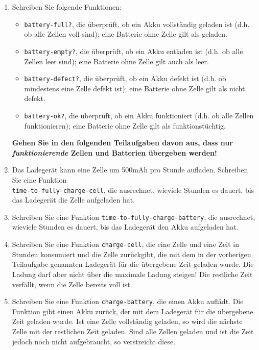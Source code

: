\begin{aufgabe}
\begin{enumerate}
  \item Schreiben Sie folgende Funktionen:

    \begin{itemize}
    \item \texttt{battery-full?}, die überprüft, ob ein Akku
      vollständig geladen ist (d.h. ob alle Zellen voll sind); eine
      Batterie ohne Zelle gilt als geladen.

    \item \texttt{battery-empty?}, die überprüft, ob ein Akku entladen
      ist (d.h. ob alle Zellen leer sind); eine Batterie ohne Zelle
      gilt auch als leer.

    \item \texttt{battery-defect?}, die überprüft, ob ein Akku defekt
      ist (d.h. ob mindestens eine Zelle defekt ist); eine Batterie
      ohne Zelle gilt als nicht defekt.

    \item \texttt{battery-ok?}, die überprüft, ob ein Akku
      funktioniert (d.h. ob alle Zellen funktionieren); eine Batterie
      ohne Zelle gilt als funktionstüchtig.
      
    \end{itemize}

    \textbf{Gehen Sie in den folgenden Teilaufgaben davon aus, dass
      nur \emph{funktionierende} Zellen und Batterien übergeben
      werden!}

  \item Das Ladegerät kann eine Zelle um 500mAh pro Stunde
    aufladen.  Schreiben Sie eine Funktion \\
    \texttt{time-to-fully-charge-cell}, die ausrechnet, wieviele
    Stunden es dauert, bis das Ladegerät die Zelle aufgeladen hat.

  \item Schreiben Sie eine Funktion
    \texttt{time-to-fully-charge-battery}, die ausrechnet, wieviele
    Stunden es dauert, bis das Ladegerät den Akku aufgeladen hat.

  \item Schreiben Sie eine Funktion \texttt{charge-cell}, die eine
    Zelle und eine Zeit in Stunden konsumiert und die Zelle
    zurückgibt, die mit dem in der vorherigen Teilaufgabe genannten
    Ladegerät für die übergebene Zeit geladen wurde.  Die Ladung darf
    aber nicht über die maximale Ladung steigen!  Die restliche Zeit
    verfällt, wenn die Zelle bereits voll ist.

  \item Schreiben Sie eine Funktion \texttt{charge-battery}, die einen
    Akku auflädt.  Die Funktion gibt einen Akku zurück, der mit dem
    Ladegerät für die übergebene Zeit geladen wurde.  Ist eine Zelle
    vollständig geladen, so wird die nächste Zelle mit der restlichen
    Zeit geladen.  Sind alle Zellen geladen und ist die Zeit jedoch
    noch nicht aufgebraucht, so verstreicht diese.


\end{enumerate}
\end{aufgabe}
